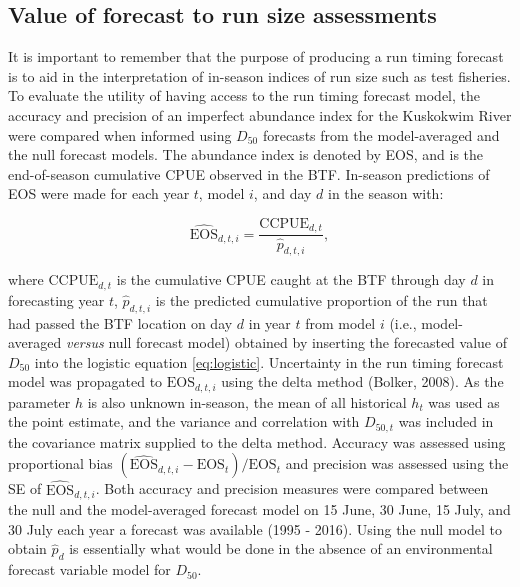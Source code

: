 \documentclass[12pt,]{book}
\theoremstyle{definition}
\theoremstyle{definition}
\theoremstyle{definition}
\theoremstyle{remark}
\begin{document}
\subsection{Value of forecast to run size
assessments}\label{value-of-forecast-to-run-size-assessments}

\noindent
It is important to remember that the purpose of producing a run timing
forecast is to aid in the interpretation of in-season indices of run
size such as test fisheries. To evaluate the utility of having access to
the run timing forecast model, the accuracy and precision of an
imperfect abundance index for the Kuskokwim River were compared when
informed using \(D_{50}\) forecasts from the model-averaged and the null
forecast models. The abundance index is denoted by EOS, and is the
end-of-season cumulative CPUE observed in the BTF. In-season predictions
of EOS were made for each year \(t\), model \(i\), and day \(d\) in the
season with:

\begin{equation}
  \widehat{\text{EOS}}_{d,t,i}=\frac{\text{CCPUE}_{d,t}}{\hat{p}_{d,t,i}},
\label{eq:eos}
\end{equation}

\noindent
where \(\text{CCPUE}_{d,t}\) is the cumulative CPUE caught at the BTF
through day \(d\) in forecasting year \(t\), \(\hat{p}_{d,t,i}\) is the
predicted cumulative proportion of the run that had passed the BTF
location on day \(d\) in year \(t\) from model \(i\) (i.e.,
model-averaged \emph{versus} null forecast model) obtained by inserting
the forecasted value of \(D_{50}\) into the logistic equation
\eqref{eq:logistic}. Uncertainty in the run timing forecast model was
propagated to \(\text{EOS}_{d,t,i}\) using the delta method (Bolker,
2008). As the parameter \(h\) is also unknown in-season, the mean of all
historical \(h_t\) was used as the point estimate, and the variance and
correlation with \(D_{50,t}\) was included in the covariance matrix
supplied to the delta method. Accuracy was assessed using proportional
bias \((\widehat{\text{EOS}}_{d,t,i} - \text{EOS}_t)/\text{EOS}_t\) and
precision was assessed using the SE of \(\widehat{\text{EOS}}_{d,t,i}\).
Both accuracy and precision measures were compared between the null and
the model-averaged forecast model on 15 June, 30 June, 15 July, and 30
July each year a forecast was available (1995 - 2016). Using the null
model to obtain \(\hat{p}_d\) is essentially what would be done in the
absence of an environmental forecast variable model for \(D_{50}\).
\end{document}
